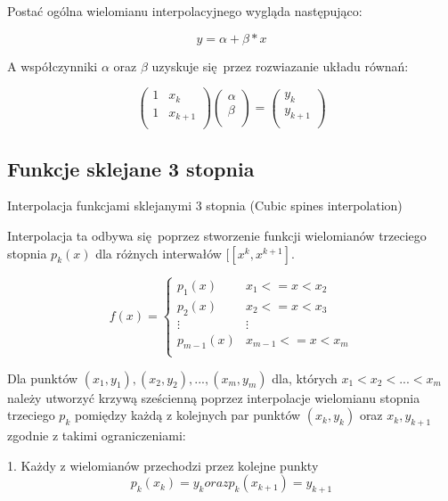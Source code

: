 \documentclass[varwidth,12pt,a4paper]{article}
\begin{document}
Postać ogólna wielomianu interpolacyjnego wygląda następująco:

\begin{equation}
    y = \alpha + \beta * x
\end{equation}

A współczynniki $\alpha$ oraz $\beta$ uzyskuje się przez rozwiazanie układu równań:

$$
\left( \begin{array}{cc}
    1 & x_k \\
    1 & x_{k + 1} \\
\end{array} \right) \left( \begin{array}{c}
\alpha\\
\beta \\
\end{array} \right) = \left( \begin{array}{c}
    y_k \\
    y_{k + 1} \\
\end{array} \right) 
$$

\subsection{Funkcje sklejane 3 stopnia}

Interpolacja funkcjami sklejanymi 3 stopnia (Cubic spines interpolation)

Interpolacja ta odbywa się poprzez stworzenie funkcji wielomianów trzeciego stopnia $ p_k(x) $
dla różnych interwałów $ [[x^k, x^{k+1}] $.

$$
    f(x) = \left\{ \begin{array}{ll}
    p_1 (x) & \textrm{$x_1 <= x < x_2$}\\
    p_2 (x) & \textrm{$x_2 <= x < x_3$}\\
    \vdots  & \vdots \\
    p_{m-1} (x) & \textrm{$x_{m-1} <= x < x_m$}\\
    \end{array} \right.
$$

Dla punktów $(x_1, y_1), (x_2, y_2), ..., (x_m, y_m)$ dla, których $x_1 < x_2 < ... < x_m $
należy utworzyć krzywą sześcienną poprzez interpolacje wielomianu stopnia trzeciego $p_k$ 
pomiędzy każdą z kolejnych par punktów $(x_k, y_k)$ oraz $x_{k}, y_{k+1}$ zgodnie z takimi ograniczeniami:

1. Każdy z wielomianów przechodzi przez kolejne punkty
\begin{equation}
    p_k (x_k) = y_k oraz p_k (x_{k+1}) = y_{k + 1}
\end{equation}
\end{document}
